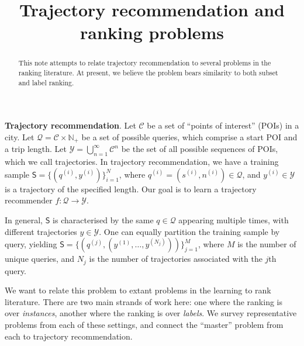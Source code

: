 \documentclass{article}
\title{Trajectory recommendation and ranking problems}
\newcommand{\SSf}{\mathsf{S}}
\newcommand{\CCal}{\mathscr{C}}
\newcommand{\QCal}{\mathscr{Q}}
\newcommand{\YCal}{\mathscr{Y}}
\begin{document}
\maketitle

\begin{abstract}
This note attempts to relate trajectory recommendation to several problems in the ranking literature.
At present, we believe the problem bears similarity to both subset and label ranking.
\end{abstract}

%
\textbf{Trajectory recommendation}.
Let $\CCal$ be a set of ``points of interest'' (POIs) in a city.
Let $\QCal = \CCal \times \mathbb{N}_+$ be a set of possible queries, which comprise a start POI and a trip length.
Let
$\YCal = \bigcup_{n = 1}^\infty \CCal^{n}$ be the set of all possible sequences of POIs, which we call trajectories.
In trajectory recommendation,
we have a training sample $\SSf = \{ ( q^{(i)}, y^{(i)} ) \}_{i = 1}^N$,
where
$q^{(i)} = ( s^{(i)}, n^{(i)} ) \in \QCal$,
and
$y^{(i)} \in \YCal$
is a trajectory of the specified length.
Our goal is to learn a trajectory recommender %
$f \colon \QCal \to \YCal$.

In general, $\SSf$ is characterised by the same $q \in \QCal$ appearing multiple times, with different trajectories $y \in \YCal$.
One can equally partition the training sample by query, yielding
$ \SSf = \{ ( q^{(j)}, ( y^{(1)}, \ldots, y^{(N_j)} ) ) \}_{j = 1}^{M} $,
where $M$ is the number of unique queries,
and $N_j$ is the number of trajectories associated with the $j$th query.

We want to relate this problem to extant problems in the learning to rank literature.
There are two main strands of work here:
one where the ranking is over \emph{instances},
another where the ranking is over \emph{labels}.
We survey representative problems from each of these settings,
and connect the ``master'' problem from each to trajectory recommendation.
\end{document}
